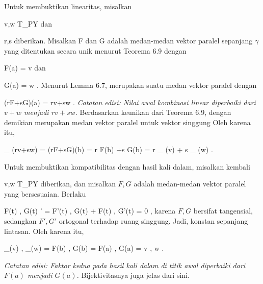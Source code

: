 {

Untuk membuktikan linearitas, misalkan

\mavergleichskette
{\vergleichskette
{ v,w
}
{ \in }{ T_PY
}
{  }{
}
{    }{
}
{   }{
}
}
{}{}{}
dan

\mavergleichskette
{\vergleichskette
{ r,s
}
{ \in }{ \R
}
{  }{
}
{    }{
}
{   }{
}
}
{}{}{}
diberikan. Misalkan
\mathkor {} {F} {dan} {G} {}
adalah medan-medan vektor paralel sepanjang $\gamma$ yang ditentukan secara unik menurut
Teorema 6.9
dengan

\mavergleichskette
{\vergleichskette
{ F(a)
}
{ = }{ v
}
{  }{
}
{    }{
}
{   }{
}
}
{}{}{}
dan

\mavergleichskette
{\vergleichskette
{ G(a)
}
{ = }{ w
}
{  }{
}
{    }{
}
{   }{
}
}
{}{}{.}
Menurut
Lemma 6.7,
 merupakan suatu medan vektor paralel dengan

\mavergleichskette
{\vergleichskette
{ (rF+sG)(a)
}
{ = }{ rv+sw
}
{  }{
}
{    }{
}
{   }{
}
}
{}{}{.}
\emph{Catatan edisi: Nilai awal kombinasi linear diperbaiki dari $v+w$ menjadi $rv+sw$.}
Berdasarkan keunikan dari
Teorema 6.9,
 dengan demikian merupakan medan vektor paralel untuk vektor singgung
 Oleh karena itu,

\mavergleichskettedisp
{\vergleichskette
{ \Psi_{\gamma} (rv+sw)
}
{ =} { (rF+sG)(b)
}
{ =} { r F(b) +s G(b)
}
{ =} { r \Psi_{\gamma} (v) + s \Psi_{\gamma} (w)
}
{ } {
}
}
{}{}{.}

Untuk membuktikan kompatibilitas dengan hasil kali dalam, misalkan kembali

\mavergleichskette
{\vergleichskette
{ v,w
}
{ \in }{ T_PY
}
{  }{
}
{    }{
}
{   }{
}
}
{}{}{}
diberikan, dan misalkan $F,G$ adalah medan-medan vektor paralel yang bersesuaian. Berlaku

\mavergleichskettedisp
{\vergleichskette
{ \left\langle  F(t) , G(t)  \right\rangle'
}
{ =} { \left\langle  F'(t) , G(t)  \right\rangle  +  \left\langle  F(t) , G'(t)  \right\rangle
}
{ =} { 0
}
{ } {
}
{ } {
}
}
{}{}{,}
karena $F,G$ bersifat tangensial, sedangkan $F',G'$ ortogonal terhadap ruang singgung. Jadi,
 konstan sepanjang lintasan. Oleh karena itu,

\mavergleichskettedisp
{\vergleichskette
{ \left\langle \Psi_\gamma(v)  , \Psi_\gamma(w)  \right\rangle
}
{ =} { \left\langle  F(b)  ,  G(b)   \right\rangle
}
{ =} { \left\langle  F(a)  ,  G(a)   \right\rangle
}
{ =} { \left\langle  v  , w  \right\rangle
}
{ } {
}
}
{}{}{.}

\emph{Catatan edisi: Faktor kedua pada hasil kali dalam di titik awal diperbaiki dari $F(a)$ menjadi $G(a)$.}
Bijektivitasnya juga jelas dari sini.

}


